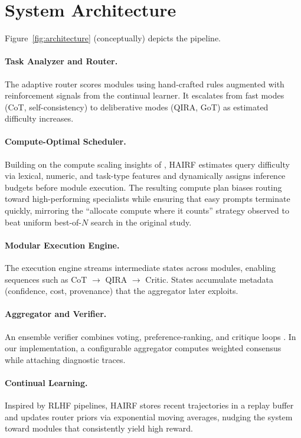 \documentclass[11pt]{article}
\begin{document}
\section{System Architecture}
\label{sec:architecture}
Figure~\ref{fig:architecture} (conceptually) depicts the pipeline.

\paragraph{Task Analyzer and Router.}
The adaptive router scores modules using hand-crafted rules augmented with reinforcement signals from the continual learner.  It escalates from fast modes (CoT, self-consistency) to deliberative modes (QIRA, GoT) as estimated difficulty increases.

\paragraph{Compute-Optimal Scheduler.}
Building on the compute scaling insights of \citet{snell2024scaling}, HAIRF estimates query difficulty via lexical, numeric, and task-type features and dynamically assigns inference budgets before module execution.  The resulting compute plan biases routing toward high-performing specialists while ensuring that easy prompts terminate quickly, mirroring the ``allocate compute where it counts'' strategy observed to beat uniform best-of-$N$ search in the original study.

\paragraph{Modular Execution Engine.}
The execution engine streams intermediate states across modules, enabling sequences such as CoT $\rightarrow$ QIRA $\rightarrow$ Critic.  States accumulate metadata (confidence, cost, provenance) that the aggregator later exploits.

\paragraph{Aggregator and Verifier.}
An ensemble verifier combines voting, preference-ranking, and critique loops \citep{zhang2024cumulative}.  In our implementation, a configurable aggregator computes weighted consensus while attaching diagnostic traces.

\paragraph{Continual Learning.}
Inspired by RLHF pipelines, HAIRF stores recent trajectories in a replay buffer and updates router priors via exponential moving averages, nudging the system toward modules that consistently yield high reward.
\end{document}
